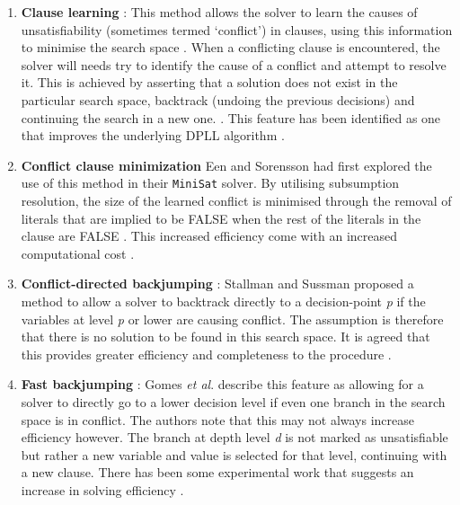 \documentclass[11pt, a4paper, oneside]{report} %
\begin{document}
\begin{enumerate}


  \item \textbf{Clause learning} :  This method allows the solver to learn the
causes of unsatisfiability (sometimes termed `conflict') in clauses, using this
information to minimise the search space \cite{biere2009conflict}. When a
conflicting clause is encountered, the solver will needs try  to identify the
cause of a conflict and attempt to resolve it. This is achieved by asserting
that a solution does not exist in the particular search space, backtrack
(undoing the previous decisions) and continuing the search in a new one.
\cite{zhang2002quest}. This feature has been identified as one that improves the
underlying DPLL algorithm \cite{zhang2002quest,gomes2008satisfiability}.

  \item \textbf{Conflict clause minimization} Een and Sorensson
\cite{sorensson2005minisat} had first explored the use of this method in their
\texttt{MiniSat} solver. By utilising subsumption resolution, the size of the
learned conflict is minimised through the removal of literals that are implied
to be FALSE when the rest of the literals in the clause are FALSE
\cite{zhang2002quest}. This increased efficiency come with an increased
computational cost \cite{gomes2008satisfiability}.

  \item \textbf{Conflict-directed backjumping} : \indent Stallman and Sussman
\cite{stallman1977forward}   proposed a method to allow a solver to backtrack
directly to a decision-point \textit{p} if the variables at level \textit{p} or
lower are causing conflict. The assumption is therefore that there is no
solution to be found in this search space. It is agreed that this provides
greater efficiency and completeness to the procedure
\cite{gomes2008satisfiability}.


  \item \textbf{Fast backjumping} : Gomes \textit{et al}.
\cite{gomes2008satisfiability} describe this feature as allowing for a solver to
directly go to a lower decision level if even one branch in the search space is
in conflict. The authors note that this may not always increase efficiency
however. The branch at depth level \textit{d} is not marked as unsatisfiable but
rather a new variable and value is selected for that level, continuing with a
new clause. There has been some experimental work that suggests an increase in
solving efficiency \cite{gomes2008satisfiability, kottler2010sat}.


\end{enumerate}
\end{document}
